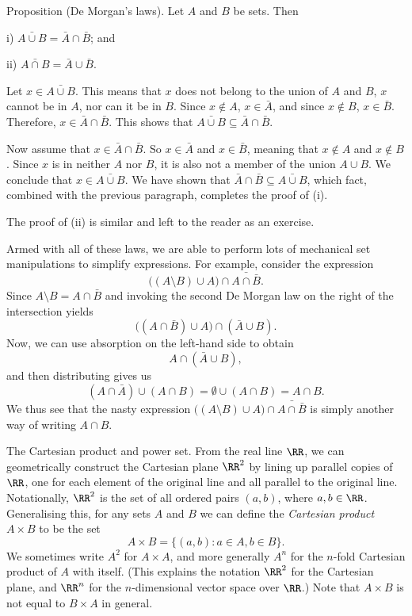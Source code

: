 \parenproclaim Proposition {\advthm} (De Morgan's laws). Let $A$ and $B$ be sets. Then
\medskip
\item{i)} $\bar{A\cup B} = \bar A \cap \bar B$; and
\smallskip
\item{ii)} $\bar{A\cap B} = \bar A \cup \bar B$.
\medskip

\proof
Let $x\in \bar{A\cup B}$. This means that $x$ does not belong to the union of $A$ and $B$,
$x$ cannot be in $A$, nor can it be in $B$. Since $x\notin A$, $x\in \bar A$, and since $x\notin B$,
$x\in \bar B$. Therefore, $x\in \bar A\cap \bar B$. This shows that $\bar{A\cup B}\subseteq \bar A\cap \bar B$.

Now assume that $x\in \bar A\cap \bar B$. So $x\in \bar A$ and $x\in \bar B$, meaning that $x\notin A$
and $x\notin B$. Since $x$ is in neither $A$ nor $B$, it is also not a member of the union $A\cup B$.
We conclude that $x\in \bar{A\cup B}$. We have shown that $\bar A\cap \bar B \subseteq \bar{A\cup B}$,
which fact, combined with the previous paragraph, completes the proof of (i).

The proof of (ii) is similar and left to the reader as an exercise.\slug

Armed with all of these laws, we are able to perform lots of mechanical set manipulations to simplify
expressions. For example, consider the expression
$$\bigl( (A\setminus B)\cup A\bigr) \cap \bar{A\cap \bar B}.$$
Since $A\setminus B = A\cap \bar B$ and invoking the second De Morgan law on the right of the intersection
yields
$$\bigl( (A\cap \bar B)\cup A\bigr) \cap (\bar A \cup B).$$
Now, we can use absorption on the left-hand side to obtain
$$A \cap (\bar A \cup B),$$
and then distributing gives us
$$(A\cap \bar A) \cup (A\cap B) = \emptyset \cup (A\cap B) = A\cap B.$$
We thus see that the nasty expression $\bigl( (A\setminus B)\cup A\bigr) \cap \bar{A\cap \bar B}$ is
simply another way of writing $A\cap B$.

\medskip\boldlabel The Cartesian product and power set. From the real line $\RR$, we can geometrically construct
the Cartesian plane $\RR^2$ by lining up parallel copies of $\RR$, one for each element of the original line
and all parallel to the original line.
Notationally, $\RR^2$ is the set of all ordered pairs $(a,b)$, where $a,b\in \RR$. Generalising this,
for any sets $A$ and $B$ we can define the {\it Cartesian product} $A\times B$
to be the set
$$A \times B = \bigl\{ (a,b) : a\in A, b\in B\bigr\}.$$
We sometimes write $A^2$ for $A\times A$, and more generally $A^n$ for the $n$-fold Cartesian product
of $A$ with itself. (This explains the notation $\RR^2$ for the Cartesian plane, and $\RR^n$ for the
$n$-dimensional vector space over $\RR$.)
Note that $A\times B$ is not equal to $B\times A$ in general.

